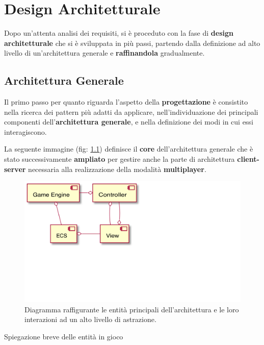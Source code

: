 \chapter{Design Architetturale}
Dopo un'attenta analisi dei requisiti, si è proceduto con la fase di \textbf{design architetturale} che si è sviluppata in più passi, partendo dalla definizione ad alto livello di un'architettura generale e \textbf{raffinandola} gradualmente. 

	
\section{Architettura Generale}
Il primo passo per quanto riguarda l'aspetto della \textbf{progettazione} è consistito nella ricerca dei pattern più adatti da applicare, nell'individuazione dei principali componenti dell'\textbf{architettura generale}, e nella definizione dei modi in cui essi interagiscono.

La seguente immagine (fig: \ref{fig:architectureClassDiagram}) definisce il \textbf{core} dell'architettura generale che è stato successivamente \textbf{ampliato} per gestire anche la parte di architettura \textbf{client-server} necessaria alla realizzazione della modalità \textbf{multiplayer}.
\begin{figure}[H]
	\centering
	\includegraphics[width=0.80\columnwidth]{plantuml/rendered/classDiagrams/architectureClassDiagram.pdf}
	\caption{Diagramma raffigurante le entità principali dell’architettura e le loro interazioni ad un alto livello di astrazione.}
	\label{fig:architectureClassDiagram}
\end{figure}

Spiegazione breve delle entità in gioco

